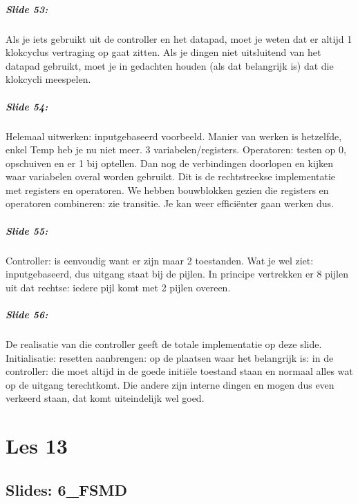 \documentclass[10pt,a4paper]{book}
\begin{document}
\paragraph{Slide 53:} Als je iets gebruikt uit de controller en het datapad, moet je weten dat er altijd 1 klokcyclus vertraging op gaat zitten. Als je dingen niet uitsluitend van het datapad gebruikt, moet je in gedachten houden (als dat belangrijk is) dat die klokcycli meespelen.

\paragraph{Slide 54:} Helemaal uitwerken: inputgebaseerd voorbeeld. Manier van werken is hetzelfde, enkel Temp heb je nu niet meer. 3 variabelen/registers. Operatoren: testen op 0, opschuiven en er 1 bij optellen. Dan nog de verbindingen doorlopen en kijken waar variabelen overal worden gebruikt. Dit is de rechtstreekse implementatie met registers en operatoren. We hebben bouwblokken gezien die registers en operatoren combineren: zie transitie. Je kan weer effici\"enter gaan werken dus.

\paragraph{Slide 55:} Controller: is eenvoudig want er zijn maar 2 toestanden. Wat je wel ziet: inputgebaseerd, dus uitgang staat bij de pijlen. In principe vertrekken er 8 pijlen uit dat rechtse: iedere pijl komt met 2 pijlen overeen. 

\paragraph{Slide 56:} De realisatie van die controller geeft de totale implementatie op deze slide.
Initialisatie: resetten aanbrengen: op de plaatsen waar het belangrijk is: in de controller: die moet altijd in de goede initi\"ele toestand staan en normaal alles wat op de uitgang terechtkomt. Die andere zijn interne dingen en mogen dus even verkeerd staan, dat komt uiteindelijk wel goed. 

\chapter{Les 13}

\section{Slides: 6\_FSMD}
\end{document}
